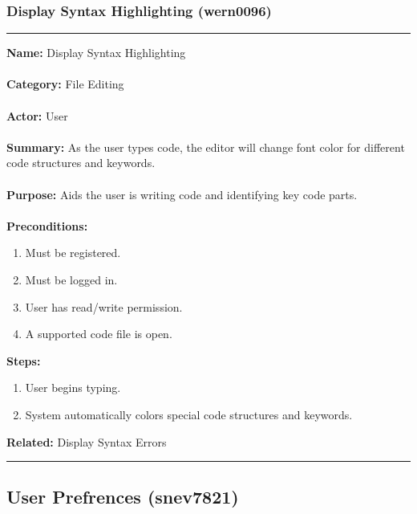 \documentclass[11pt]{report}
\begin{document}
\subsubsection{Display Syntax Highlighting (wern0096)}
\vspace{2pt}
\hrule
\vspace{8pt}
	\noindent\textbf{Name:} Display Syntax Highlighting \\ \\
	\textbf{Category:} File Editing \\ \\
	\textbf{Actor:} User \\ \\
	\textbf{Summary:} As the user types code, the editor will change font color for different code structures and keywords. \\ \\
	\textbf{Purpose:} Aids the user is writing code and identifying key code parts. \\ \\
	\textbf{Preconditions:} 
	\begin{enumerate}
		\item Must be registered.
		\item Must be logged in.
		\item User has read/write permission.
		\item A supported code file is open.
	\end{enumerate}
	\textbf{Steps:}
	\begin{enumerate}
		\item User begins typing.
		\item System automatically colors special code structures and keywords.
	\end{enumerate}
	\textbf{Related:} Display Syntax Errors
\vspace{8pt}
\hrule

\newpage

\subsection{User Prefrences (snev7821)}
\end{document}
